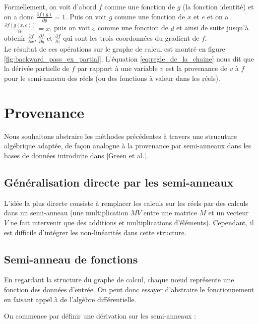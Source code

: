 \documentclass[11pt,a4paper]{article}
\begin{document}
	
	Formellement, on voit d'abord $f$ comme une fonction de $g$ (la fonction identité) et on a donc $\frac{\partial f(g)}{\partial g} = 1$. Puis on voit $g$ comme une fonction de $x$ et $e$ et on a $\frac{\partial f(g(x,e))}{\partial e}=x$, puis on voit $e$ comme une fonction de $d$ et ainsi de suite jusqu'à obtenir $\frac{\partial f}{\partial x}$, $\frac{\partial f}{\partial y}$ et $\frac{\partial f}{\partial z}$ qui sont les trois coordonnées du gradient de $f$.\\
	
	Le résultat de ces opérations sur le graphe de calcul est montré en figure \ref{fig:backward_pass_ex_partial}. L'équation \ref{eq:regle_de_la_chaine} nous dit que la dérivée partielle de $f$ par rapport à une variable $v$ est la provenance de $v$ à $f$ pour le semi-anneau des réels (ou des fonctions à valeur dans les réels).

\section{Provenance}

Nous souhaitons abstraire les méthodes précédentes à travers une strucuture algébrique adaptée, de façon analogue à la provenance par semi-anneaux dans les bases de données introduite dans [Green et al.].

	\subsection{Généralisation directe par les semi-anneaux}

	L'idée la plus directe consiste à remplacer les calculs sur les réels par des calculs dans un semi-anneau (une multiplication $M V$ entre une matrice $M$ et un vecteur $V$ ne fait intervenir que des additions et multiplications d'éléments). Cependant, il est difficile d'intégrer les non-linéarités dans cette structure.

	\subsection{Semi-anneau de fonctions}
	
	En regardant la structure du graphe de calcul, chaque n\oe ud représente une fonction des données d'entrée. On peut donc essayer d'abstraire le fonctionnement en faisant appel à de l'algèbre différentielle. 
	
	On commence par définir une dérivation sur les semi-anneaux :
	
\end{document}
